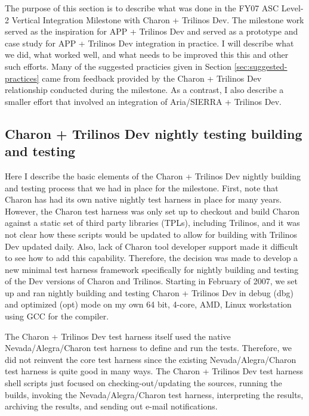 \documentclass[pdf,ps2pdf,11pt]{SANDreport}
\begin{document}
The purpose of this section is to describe what was done in the FY07 ASC
Level-2 Vertical Integration Milestone with Charon + Trilinos Dev.  The
milestone work served as the inspiration for APP + Trilinos Dev and served as
a prototype and case study for APP + Trilinos Dev integration in practice.  I
will describe what we did, what worked well, and what needs to be improved
this this and other such efforts.  Many of the suggested practicies given in
Section {}\ref{sec:suggested-practices} came from feedback provided by the
Charon + Trilinos Dev relationship conducted during the milestone.  As a
contrast, I also describe a smaller effort that involved an integration of
Aria/SIERRA + Trilinos Dev.


%
\subsection{Charon + Trilinos Dev nightly testing building and testing}
%

Here I describe the basic elements of the Charon + Trilinos Dev nightly
building and testing process that we had in place for the milestone.  First,
note that Charon has had its own native nightly test harness in place for many
years.  However, the Charon test harness was only set up to checkout and build
Charon against a static set of third party libraries (TPLs), including
Trilinos, and it was not clear how these scripts would be updated to allow for
building with Trilinos Dev updated daily.  Also, lack of Charon tool developer
support made it difficult to see how to add this capability.  Therefore, the
decision was made to develop a new minimal test harness framework specifically
for nightly building and testing of the Dev versions of Charon and Trilinos.
Starting in February of 2007, we set up and ran nightly building and testing
Charon + Trilinos Dev in debug (dbg) and optimized (opt) mode on my own 64
bit, 4-core, AMD, Linux workstation using GCC for the compiler.

The Charon + Trilinos Dev test harness itself used the native
Nevada/Alegra/Charon test harness to define and run the tests.  Therefore, we
did not reinvent the core test harness since the existing Nevada/Alegra/Charon
test harness is quite good in many ways.  The Charon + Trilinos Dev test
harness shell scripts just focused on checking-out/updating the sources,
running the builds, invoking the Nevada/Alegra/Charon test harness,
interpreting the results, archiving the results, and sending out e-mail
notifications.
\end{document}
